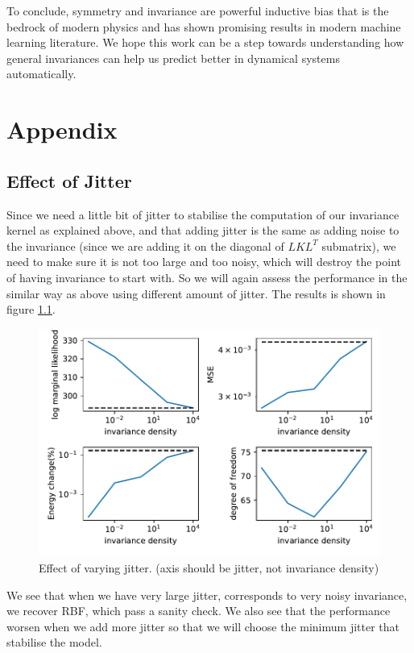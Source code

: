 \documentclass{statsmsc}
\begin{document}
To conclude, symmetry and invariance are powerful inductive bias that is the bedrock of modern physics and has shown promising results in modern machine learning literature. 
We hope this work can be a step towards understanding how general invariances can help us predict better in dynamical systems automatically.






\clearpage
\renewcommand*{\thepage}{A\arabic{page}}
\appendix

\chapter{Appendix}

\section{Effect of Jitter}
Since we need a little bit of jitter to stabilise the computation of our invariance kernel as explained above, and that adding jitter is the same as adding noise to the invariance (since we are adding it on the diagonal of $LKL^T$ submatrix), we need to make sure it is not too large and too noisy, which will destroy the point of having invariance to start with. 
So we will again assess the performance in the similar way as above using different amount of jitter.
The results is shown in figure \ref{fig:vary_jitter}.

\begin{figure}[H] 
  \includegraphics[width=0.8\linewidth]{../codes/figures/vary_jitter.pdf}
  \centering
  \caption{Effect of varying jitter. (axis should be jitter, not invariance density)}
  \label{fig:vary_jitter}
\end{figure}

We see that when we have very large jitter, corresponds to very noisy invariance, we recover RBF, which pass a sanity check.
We also see that the performance worsen when we add more jitter so that we will choose the minimum jitter that stabilise the model.
\end{document}
